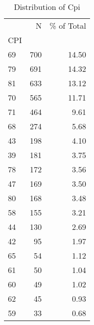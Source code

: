 \begin{table*}[htbp]
\centering
\small
\caption{Distribution of Cpi}
\label{tab:dist_cpi}
\begin{tabular}{lrr}
\toprule
 & N & \% of Total \\
CPI &  &  \\
\midrule
69 & 700 & 14.50 \\
79 & 691 & 14.32 \\
81 & 633 & 13.12 \\
70 & 565 & 11.71 \\
71 & 464 & 9.61 \\
68 & 274 & 5.68 \\
43 & 198 & 4.10 \\
39 & 181 & 3.75 \\
78 & 172 & 3.56 \\
47 & 169 & 3.50 \\
80 & 168 & 3.48 \\
58 & 155 & 3.21 \\
44 & 130 & 2.69 \\
42 & 95 & 1.97 \\
65 & 54 & 1.12 \\
61 & 50 & 1.04 \\
60 & 49 & 1.02 \\
62 & 45 & 0.93 \\
59 & 33 & 0.68 \\
\bottomrule
\end{tabular}
\end{table*}
